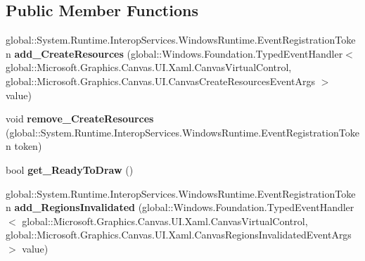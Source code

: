 \subsection*{Public Member Functions}
\begin{DoxyCompactItemize}
\item 
\mbox{\label{class_microsoft_1_1_graphics_1_1_canvas_1_1_u_i_1_1_xaml_1_1_canvas_virtual_control_a4223ddace384a3165f478a4d7db7b73a}} 
global\+::\+System.\+Runtime.\+Interop\+Services.\+Windows\+Runtime.\+Event\+Registration\+Token {\bfseries add\+\_\+\+Create\+Resources} (global\+::\+Windows.\+Foundation.\+Typed\+Event\+Handler$<$ global\+::\+Microsoft.\+Graphics.\+Canvas.\+U\+I.\+Xaml.\+Canvas\+Virtual\+Control, global\+::\+Microsoft.\+Graphics.\+Canvas.\+U\+I.\+Canvas\+Create\+Resources\+Event\+Args $>$ value)
\item 
\mbox{\label{class_microsoft_1_1_graphics_1_1_canvas_1_1_u_i_1_1_xaml_1_1_canvas_virtual_control_a12628d4980246897d39f0971c3287ca0}} 
void {\bfseries remove\+\_\+\+Create\+Resources} (global\+::\+System.\+Runtime.\+Interop\+Services.\+Windows\+Runtime.\+Event\+Registration\+Token token)
\item 
\mbox{\label{class_microsoft_1_1_graphics_1_1_canvas_1_1_u_i_1_1_xaml_1_1_canvas_virtual_control_af6528db89b7f78c8130c559d594d8300}} 
bool {\bfseries get\+\_\+\+Ready\+To\+Draw} ()
\item 
\mbox{\label{class_microsoft_1_1_graphics_1_1_canvas_1_1_u_i_1_1_xaml_1_1_canvas_virtual_control_a4e2d94f4f40419484642f72168ab3bb1}} 
global\+::\+System.\+Runtime.\+Interop\+Services.\+Windows\+Runtime.\+Event\+Registration\+Token {\bfseries add\+\_\+\+Regions\+Invalidated} (global\+::\+Windows.\+Foundation.\+Typed\+Event\+Handler$<$ global\+::\+Microsoft.\+Graphics.\+Canvas.\+U\+I.\+Xaml.\+Canvas\+Virtual\+Control, global\+::\+Microsoft.\+Graphics.\+Canvas.\+U\+I.\+Xaml.\+Canvas\+Regions\+Invalidated\+Event\+Args $>$ value)
\item 
\mbox{\label{class_microsoft_1_1_graphics_1_1_canvas_1_1_u_i_1_1_xaml_1_1_canvas_virtual_control_a6ca7dfb4d3d175d3b2a55029b1f0f300}} 

\end{DoxyCompactItemize}
